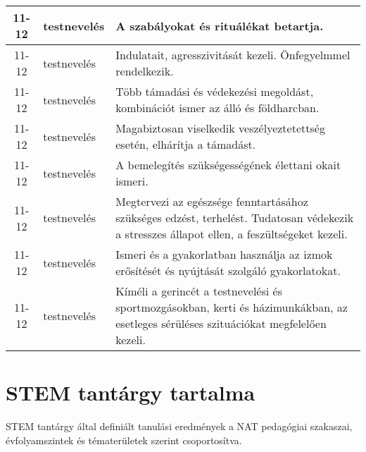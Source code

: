 \begin{small}
\begin{longtable}{c | p{2cm} |  p{11cm} }
              11-12 & testnevelés & A szabályokat és rituálékat betartja. \\ \hline
              11-12 & testnevelés & Indulatait, agresszivitását kezeli. Önfegyelmmel rendelkezik. \\ \hline
              11-12 & testnevelés & Több támadási és védekezési megoldást, kombinációt ismer az álló és földharcban. \\ \hline
              11-12 & testnevelés & Magabiztosan viselkedik veszélyeztetettség esetén, elhárítja a támadást. \\ \hline
              11-12 & testnevelés & A bemelegítés szükségességének élettani okait ismeri. \\ \hline
              11-12 & testnevelés & Megtervezi az egészsége fenntartásához szükséges edzést, terhelést. Tudatosan védekezik a stresszes állapot ellen, a feszültségeket kezeli. \\ \hline
              11-12 & testnevelés & Ismeri és a gyakorlatban használja az izmok erősítését és nyújtását szolgáló gyakorlatokat. \\ \hline
              11-12 & testnevelés & Kíméli a gerincét a testnevelési és sportmozgásokban, kerti és házimunkákban, az esetleges sérüléses szituációkat megfelelően kezeli. \\ \hline
      \end{longtable}
\end{small}




\section{STEM tantárgy tartalma }
STEM tantárgy által definiált tanulási eredmények a NAT pedagógiai szakaszai, évfolyamszintek és tématerületek szerint csoportosítva.

